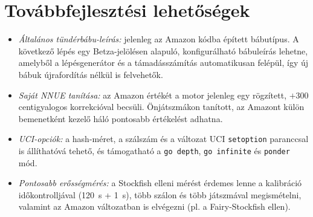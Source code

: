 \section{Továbbfejlesztési lehetőségek}

\begin{itemize}
	\item \emph{Általános tündérbábu-leírás:} jelenleg az Amazon kódba épített bábutípus. A következő lépés egy Betza-jelölésen alapuló, konfigurálható bábuleírás lehetne, amelyből a lépésgenerátor és a támadásszámítás automatikusan felépül, így új bábuk újrafordítás nélkül is felvehetők.
	\item \emph{Saját NNUE tanítása:} az Amazon értékét a motor jelenleg egy rögzített, $+300$ centigyalogos korrekcióval becsüli. Önjátszmákon tanított, az Amazont külön bemenetként kezelő háló pontosabb értékelést adhatna.
	\item \emph{UCI-opciók:} a hash-méret, a szálszám és a változat UCI \texttt{setoption} paranccsal is állíthatóvá tehető, és támogatható a \texttt{go depth}, \texttt{go infinite} és \texttt{ponder} mód.
	\item \emph{Pontosabb erősségmérés:} a Stockfish elleni mérést érdemes lenne a kalibráció időkontrolljával (120~s + 1~s), több szálon és több játszmával megismételni, valamint az Amazon változatban is elvégezni (pl. a Fairy-Stockfish ellen).
\end{itemize}
